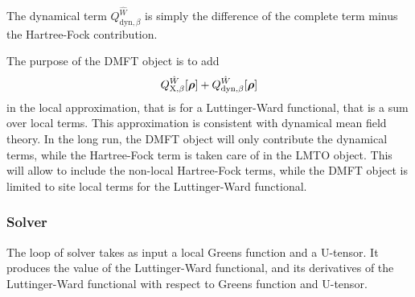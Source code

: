 \documentclass[11pt,a4paper]{report}
\begin{document}
The dynamical term $Q_{\text{dyn},\beta}^{\hat{W}}$
is simply the difference of the complete term minus
the Hartree-Fock contribution.

The purpose of the DMFT object is to add
\begin{eqnarray}
  Q_{\text{X},\beta}^{\hat{W}}[\bm{\rho}]
  +Q_{\text{dyn},\beta}^{\hat{W}}[\bm{\rho}]
\end{eqnarray}
in the local approximation, that is for a Luttinger-Ward functional,
that is a sum over local terms. This approximation is consistent with
dynamical mean field theory. In the long run, the DMFT object will
only contribute the dynamical terms, while the Hartree-Fock term is
taken care of in the LMTO object. This will allow to include the
non-local Hartree-Fock terms, while the DMFT object is limited to site
local terms for the Luttinger-Ward functional.

\subsubsection{Solver}
The loop of solver takes as input a local Greens function and a
U-tensor. It produces the value of the Luttinger-Ward functional, and
its derivatives of the Luttinger-Ward functional with respect to
Greens function and U-tensor.
\end{document}
